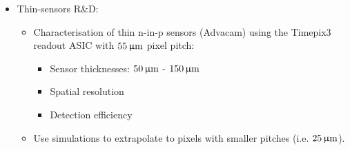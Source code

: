 \begin{frame}
\begin{columns}
    \centering
    \begin{adjustbox}{max totalsize={.9\textwidth}{.9\textheight},center}
    \end{adjustbox}


  \end{columns}


  \begin{columns}
    \begin{itemize}
    \item Thin-sensors R\&D:
      \begin{itemize}
      \item Characterisation of thin n-in-p sensors (Advacam) using the
        Timepix3 readout ASIC with \textcolor{Blue}{$55\,\upmu\mathrm{m}$} pixel
        pitch:
        \begin{itemize}
        \item Sensor thicknesses: $50\,\upmu\mathrm{m}$ - $150\,\upmu\mathrm{m}$
        \item Spatial resolution
        \item Detection efficiency
        \end{itemize}
      \item Use simulations to extrapolate to pixels with smaller
        pitches (i.e. $25\,\upmu\mathrm{m}$).
      \end{itemize}
    \end{itemize}


\end{columns}
\end{frame}

